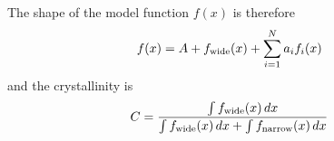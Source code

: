 \documentclass[a4paper, 12pt]{article}
\begin{document}
The shape of the model function $f(x)$ is therefore
\begin{align}
f(x) &= A + f_{\rm wide}(x) + \sum_{i=1}^N a_i f_i(x)
\end{align}
and the crystallinity is
\begin{align}
C &= \frac{\int f_{\rm wide}(x) \, dx}
          {\int f_{\rm wide}(x) \, dx + \int f_{\rm narrow}(x) \, dx}
\end{align}




\end{document}
